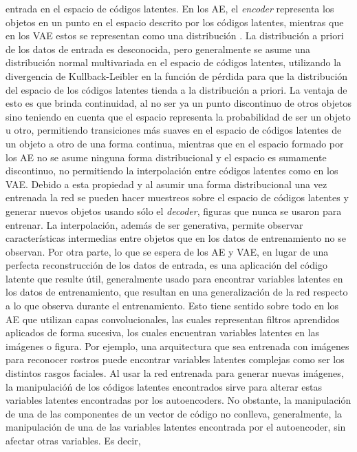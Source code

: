 \documentclass[12pt, spanish]{article}
\begin{document}
entrada en el espacio de códigos latentes.  En los AE, el \textit{encoder}
representa los objetos en un punto en el espacio descrito por los códigos
latentes, mientras que en los VAE estos se representan como una
distribución \cite{Foster2019}. La distribución a priori de los datos de
entrada es desconocida, pero generalmente se asume una distribución normal
multivariada en el espacio de códigos latentes, utilizando la divergencia
de Kullback-Leibler en la función de pérdida para que la distribución del
espacio de los códigos latentes tienda a la distribución a priori.
La ventaja de esto es que brinda continuidad, al no ser ya un punto
discontinuo de otros objetos sino teniendo en cuenta que el espacio
representa la probabilidad de ser un objeto u otro, permitiendo
transiciones más suaves en el espacio de códigos latentes de un objeto a
otro de una forma continua, mientras que en el espacio formado por los
AE no se asume ninguna forma distribucional y el espacio es sumamente
discontinuo, no permitiendo la interpolación entre códigos latentes como
en los VAE. Debido a esta propiedad y al asumir una forma distribucional
una vez entrenada la red se pueden hacer muestreos sobre el espacio de
códigos latentes y generar nuevos objetos usando sólo el \textit{decoder},
figuras que nunca se usaron para entrenar. La interpolación, además de
ser generativa, permite observar características intermedias entre objetos
que en los datos de entrenamiento no se observan.
Por otra parte, lo que se espera de los AE y VAE, en lugar de una perfecta reconstrucción de
los datos de entrada, es una aplicación del código latente que resulte
útil, generalmente usado para encontrar variables latentes en los datos
de entrenamiento, que resultan en una generalización de la red respecto
a lo que observa durante el entrenamiento. Esto tiene sentido sobre todo
en los AE que utilizan capas convolucionales, las cuales representan
filtros aprendidos aplicados de forma sucesiva, los cuales encuentran
variables latentes en las imágenes o figura. Por ejemplo, una arquitectura
que sea entrenada con imágenes para reconocer rostros \cite{Higgins2017}
puede encontrar variables latentes complejas como ser los distintos
rasgos faciales. Al usar la red entrenada para generar nuevas imágenes,
la manipulacióń de los códigos latentes encontrados sirve para alterar
estas variables latentes encontradas por los autoencoders. No obstante,
la manipulación de una de las componentes de un vector de código
no conlleva, generalmente, la manipulación de una de las variables latentes
encontrada por el autoencoder, sin afectar otras variables. Es decir,
\end{document}
